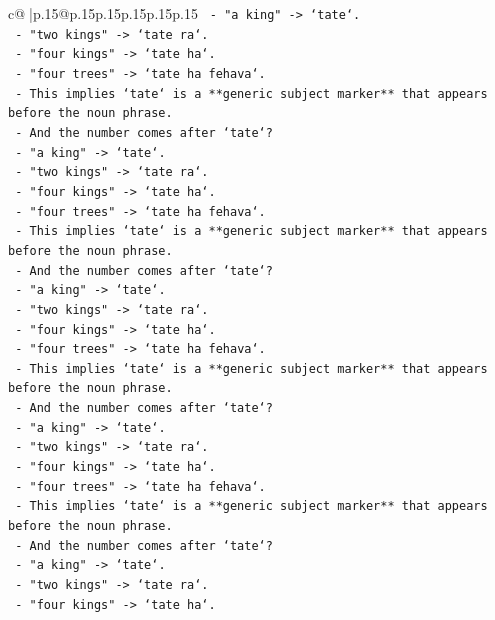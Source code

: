 \documentclass{article}
\begin{document}
{\begin{supertabular}{c@{$\;$}|p{.15\linewidth}@{}p{.15\linewidth}p{.15\linewidth}p{.15\linewidth}p{.15\linewidth}p{.15\linewidth}}
{{{\texttt{    {-} "a king" {-}> `tate`.} \\
\texttt{    {-} "two kings" {-}> `tate ra`.} \\
\texttt{    {-} "four kings" {-}> `tate ha`.} \\
\texttt{    {-} "four trees" {-}> `tate ha fehava`.} \\
\texttt{    {-} This implies `tate` is a **generic subject marker** that appears before the noun phrase.} \\
\texttt{    {-} And the number comes after `tate`?} \\
\texttt{    {-} "a king" {-}> `tate`.} \\
\texttt{    {-} "two kings" {-}> `tate ra`.} \\
\texttt{    {-} "four kings" {-}> `tate ha`.} \\
\texttt{    {-} "four trees" {-}> `tate ha fehava`.} \\
\texttt{    {-} This implies `tate` is a **generic subject marker** that appears before the noun phrase.} \\
\texttt{    {-} And the number comes after `tate`?} \\
\texttt{    {-} "a king" {-}> `tate`.} \\
\texttt{    {-} "two kings" {-}> `tate ra`.} \\
\texttt{    {-} "four kings" {-}> `tate ha`.} \\
\texttt{    {-} "four trees" {-}> `tate ha fehava`.} \\
\texttt{    {-} This implies `tate` is a **generic subject marker** that appears before the noun phrase.} \\
\texttt{    {-} And the number comes after `tate`?} \\
\texttt{    {-} "a king" {-}> `tate`.} \\
\texttt{    {-} "two kings" {-}> `tate ra`.} \\
\texttt{    {-} "four kings" {-}> `tate ha`.} \\
\texttt{    {-} "four trees" {-}> `tate ha fehava`.} \\
\texttt{    {-} This implies `tate` is a **generic subject marker** that appears before the noun phrase.} \\
\texttt{    {-} And the number comes after `tate`?} \\
\texttt{    {-} "a king" {-}> `tate`.} \\
\texttt{    {-} "two kings" {-}> `tate ra`.} \\
\texttt{    {-} "four kings" {-}> `tate ha`.} \\
}}}
\end{supertabular}}
\end{document}
